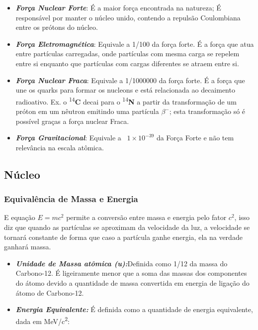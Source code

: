 \documentclass[11pt,a4paper]{article}
\begin{document}
                \begin{itemize}
                    \item \textbf{\textit{\textcolor{CarnationPink}{Força Nuclear Forte}}}: É a maior força encontrada na natureza; É responsável por manter o núcleo unido, contendo a repulsão Coulombiana entre os prótons do núcleo.
                    \item \textbf{\textit{\textcolor{CarnationPink}{Força Eletromagnética}}}: Equivale a 1/100 da força forte. É a força que atua entre partículas carregadas, onde partículas com mesma carga se repelem entre si enquanto que partículas com cargas diferentes se atraem entre si.
                    \item \textbf{\textit{\textcolor{CarnationPink}{Força Nuclear Fraca}}}: Equivale a 1/1000000 da força forte. É a força que une os quarks para formar os nucleons e está relacionada ao decaimento radioativo. Ex. o \textsuperscript{14}\textbf{C} decai para o  \textsuperscript{14}\textbf{N} a partir da transformação de um próton em um nêutron emitindo uma partícula $\beta ^-$; esta transformação só é possível graças a força nuclear Fraca.
                    \item \textbf{\textit{\textcolor{CarnationPink}{Força Gravitacional}}}: Equivale a ~$1 \times 10^{-39}$ da Força Forte e não tem relevância na escala atômica.
                \end{itemize}

        \subsection{Núcleo}
            \subsubsection{Equivalência de Massa e Energia}

                E equação  $E = m c^2$ permite a conversão entre massa e energia pelo fator $c^2$, isso diz que quando as partículas se aproximam da velocidade da luz, a velocidade se tornará constante de forma que caso a partícula ganhe energia, ela na verdade ganhará massa.


                \begin{itemize}
                    \item \textbf{\textit{\textcolor{CarnationPink}{Unidade de Massa atômica (u):}}}Definida como 1/12 da massa do Carbono-12. É ligeiramente menor que a soma das massas dos componentes do átomo devido a quantidade de massa convertida em energia de ligação do átomo de Carbono-12.  
                    \item \textbf{\textit{\textcolor{CarnationPink}{Energia Equivalente:}}} É definida como a quantidade de energia equivalente, dada em \unit{MeV/c^2}:

                \end{itemize}
\end{document}
